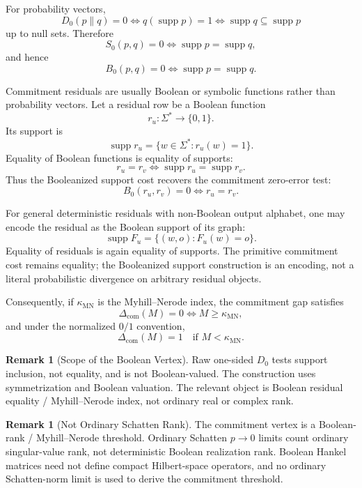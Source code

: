 \documentclass[12pt]{article}
\theoremstyle{definition}
\newtheorem{remark}[theorem]{Remark}
\DeclareMathOperator{\supp}{supp}
\newcommand{\Com}{\Delta_{\mathrm{com}}}
\newcommand{\kappaMN}{\kappa_{\mathrm{MN}}}
\begin{document}
For probability vectors,
\[
D_0(p\|q)=0
\iff
q(\supp p)=1
\iff
\supp q\subseteq\supp p
\]
up to null sets.  Therefore
\[
S_0(p,q)=0
\iff
\supp p=\supp q,
\]
and hence
\[
B_0(p,q)=0
\iff
\supp p=\supp q.
\]

Commitment residuals are usually Boolean or symbolic functions rather than
probability vectors.  Let a residual row be a Boolean function
\[
r_u:\Sigma^*\to\{0,1\}.
\]
Its support is
\[
\supp r_u
=
\{w\in\Sigma^*:r_u(w)=1\}.
\]
Equality of Boolean functions is equality of supports:
\[
r_u=r_v
\iff
\supp r_u=\supp r_v.
\]
Thus the Booleanized support cost recovers the commitment zero-error test:
\[
B_0(r_u,r_v)=0
\iff
r_u=r_v.
\]

For general deterministic residuals with non-Boolean output alphabet, one may
encode the residual as the Boolean support of its graph:
\[
\supp F_u
=
\{(w,o):F_u(w)=o\}.
\]
Equality of residuals is again equality of supports.  The primitive commitment
cost remains equality; the Booleanized support construction is an encoding,
not a literal probabilistic divergence on arbitrary residual objects.

Consequently, if $\kappaMN$ is the Myhill--Nerode index, the commitment gap
satisfies
\[
\Com(M)=0
\iff
M\ge\kappaMN,
\]
and under the normalized $0/1$ convention,
\[
\Com(M)=1
\quad
\text{if }M<\kappaMN.
\]

\begin{remark}[Scope of the Boolean Vertex]
\label{rem:commitment-alpha0-scope}
Raw one-sided $D_0$ tests support inclusion, not equality, and is not
Boolean-valued.  The construction uses symmetrization and Boolean valuation.
The relevant object is Boolean residual equality / Myhill--Nerode index, not
ordinary real or complex rank.
\end{remark}

\begin{remark}[Not Ordinary Schatten Rank]
\label{rem:commitment-not-schatten}
The commitment vertex is a Boolean-rank / Myhill--Nerode threshold.  Ordinary
Schatten $p\to0$ limits count ordinary singular-value rank, not deterministic
Boolean realization rank.  Boolean Hankel matrices need not define compact
Hilbert-space operators, and no ordinary Schatten-norm limit is used to derive
the commitment threshold.
\end{remark}
\end{document}
